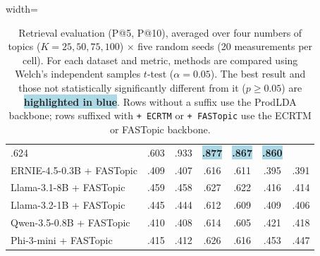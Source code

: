 \begin{table}[t]
\begin{adjustbox}{width=\linewidth}
\begin{tabular}{l *{6}{c}}
.624 & .603 & .933 & \colorbox{lightblue}{\textbf{.877}} & \colorbox{lightblue}{\textbf{.867}} & \colorbox{lightblue}{\textbf{.860}} \\
ERNIE-4.5-0.3B + FASTopic &
.409 & .407 & .616 & .611 & .395 & .391 \\
Llama-3.1-8B + FASTopic &
.459 & .458 & .627 & .622 & .416 & .414 \\
Llama-3.2-1B + FASTopic &
.445 & .444 & .612 & .609 & .409 & .406 \\
Qwen-3.5-0.8B + FASTopic &
.410 & .408 & .614 & .605 & .421 & .418 \\
Phi-3-mini + FASTopic &
.415 & .412 & .626 & .616 & .453 & .447 \\
\bottomrule
\end{tabular}
\end{adjustbox}
\caption{
Retrieval evaluation (P@5, P@10), averaged over four numbers of topics ($K=25, 50, 75, 100$) $\times$ five random seeds (20 measurements per cell).
For each dataset and metric, methods are compared using Welch's independent samples $t$-test ($\alpha=0.05$). The best result and those not statistically significantly different from it ($p \ge 0.05$) are \colorbox{lightblue}{\textbf{highlighted in blue}}.
Rows without a suffix use the ProdLDA backbone; rows suffixed with \texttt{+ ECRTM} or \texttt{+ FASTopic} use the ECRTM or FASTopic backbone.
}
\label{tab:retrieval-results}
\vspace{-1em}
\end{table}
